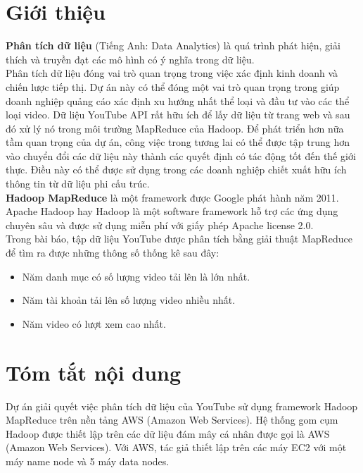 \documentclass{hcmutarticle}
\begin{document}
	
	\section{Giới thiệu}
	
	\textbf{Phân tích dữ liệu} 
	(Tiếng Anh: Data Analytics) là quá trình phát hiện, giải thích và truyền đạt các mô hình có ý nghĩa trong dữ liệu.~\\
	\newline
	Phân tích dữ liệu đóng vai trò quan trọng trong việc xác định kinh doanh
	và chiến lược tiếp thị. Dự án này có thể đóng một vai trò quan trọng trong
	giúp doanh nghiệp quảng cáo xác định xu hướng nhất
	thể loại và đầu tư vào các thể loại video. Dữ liệu YouTube
	API rất hữu ích để lấy dữ liệu từ trang web và sau đó xử lý nó
	trong môi trường MapReduce của Hadoop. Để phát triển hơn nữa
	tầm quan trọng của dự án, công việc trong tương lai có thể được tập trung hơn vào
	chuyển đổi các dữ liệu này thành các quyết định có tác động tốt đến
	thế giới thực. Điều này có thể được sử dụng trong các doanh nghiệp chiết xuất hữu ích
	thông tin từ dữ liệu phi cấu trúc.\\
	\newline
	\textbf{Hadoop MapReduce} là một framework được Google phát hành năm 2011. Apache Hadoop hay Hadoop là một software framework hỗ trợ các ứng dụng chuyên sâu và được sử dụng miễn phí với giấy phép Apache license 2.0. \\
	
	Trong bài báo, tập dữ liệu YouTube được phân tích bằng giải thuật MapReduce để tìm ra được những thông số thống kê sau đây:
	\begin{itemize}
		\item Năm danh mục có số lượng video tải lên là lớn nhất.
		\item Năm tài khoản tải lên số lượng video nhiều nhất.
		\item Năm video có lượt xem cao nhất.
	\end{itemize}
	
	\newpage
	
	\section{Tóm tắt nội dung}\label{survey}
	Dự án giải quyết việc phân tích dữ liệu của YouTube sử dụng framework Hadoop MapReduce trên nền tảng AWS (Amazon Web Services). Hệ thống gom cụm Hadoop được thiết lập trên các dữ liệu đám mây cá nhân được gọi là AWS (Amazon Web Services).
	Với AWS, tác giả thiết lập trên các máy EC2 với một máy name node và 5 máy data nodes.
	
\end{document}
